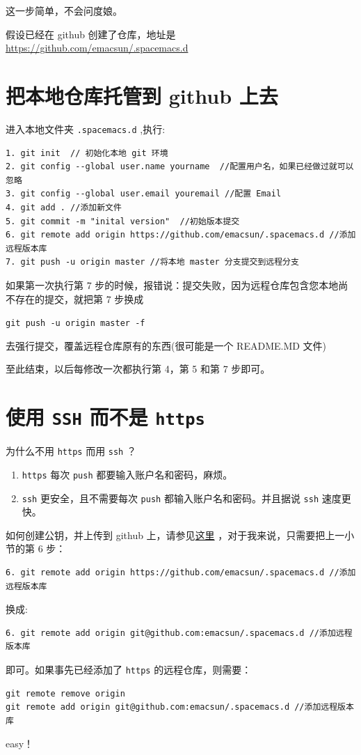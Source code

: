 \documentclass[10pt,a4paper,UTF8]{article}
\begin{document}
这一步简单，不会问度娘。

假设已经在 github 创建了仓库，地址是 \url{https://github.com/emacsun/.spacemacs.d}

\section{把本地仓库托管到 github 上去}
\label{sec:org93fa8f8}


进入本地文件夹 \texttt{.spacemacs.d} ,执行:
\begin{verbatim}
1. git init  // 初始化本地 git 环境
2. git config --global user.name yourname  //配置用户名，如果已经做过就可以忽略
3. git config --global user.email youremail //配置 Email
4. git add . //添加新文件
5. git commit -m "inital version"  //初始版本提交
6. git remote add origin https://github.com/emacsun/.spacemacs.d //添加远程版本库
7. git push -u origin master //将本地 master 分支提交到远程分支
\end{verbatim}

如果第一次执行第 7 步的时候，报错说：提交失败，因为远程仓库包含您本地尚不存在的提交，就把第 7 步换成

\texttt{git push -u origin master -f}

去强行提交，覆盖远程仓库原有的东西(很可能是一个 README.MD 文件)

至此结束，以后每修改一次都执行第 4，第 5 和第 7 步即可。
\section{使用 \texttt{SSH} 而不是 \texttt{https}}
\label{sec:orgfdd7e37}


为什么不用 \texttt{https} 而用 \texttt{ssh} ？

\begin{enumerate}
\item \texttt{https} 每次 \texttt{push} 都要输入账户名和密码，麻烦。
\item \texttt{ssh} 更安全，且不需要每次 \texttt{push} 都输入账户名和密码。并且据说 \texttt{ssh} 速度更快。
\end{enumerate}

如何创建公钥，并上传到 github 上，请参见\href{http://www.open-open.com/lib/view/open1416647023164.html}{这里} ，对于我来说，只需要把上一小节的第 6 步：
\begin{verbatim}
6. git remote add origin https://github.com/emacsun/.spacemacs.d //添加远程版本库
\end{verbatim}

换成:
\begin{verbatim}
6. git remote add origin git@github.com:emacsun/.spacemacs.d //添加远程版本库
\end{verbatim}
即可。如果事先已经添加了 \texttt{https} 的远程仓库，则需要：
\begin{verbatim}
git remote remove origin
git remote add origin git@github.com:emacsun/.spacemacs.d //添加远程版本库
\end{verbatim}

easy！
\end{document}
